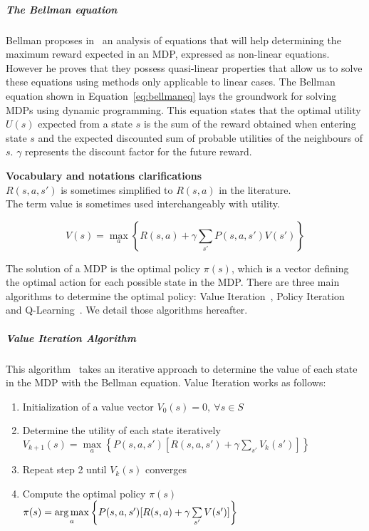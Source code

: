 \subparagraph{The Bellman equation}
Bellman proposes in~\cite{bellman1957} an analysis of equations that will help determining the maximum reward expected in an MDP, expressed as non-linear equations. However he proves that they possess quasi-linear properties that allow us to solve these equations using methods only applicable to linear cases. 
The Bellman equation shown in Equation~\eqref{eq:bellmaneq} lays the groundwork for solving MDPs using dynamic programming.
This equation states that the optimal utility $U(s)$ expected from a state $s$ is the sum of the reward obtained when entering state $s$ and the expected discounted sum of probable utilities of the neighbours of $s$. $\gamma$ represents the discount factor for the future reward.


\textbf{Vocabulary and notations clarifications}\\
$R(s,a,s')$ is sometimes simplified to $R(s,a)$ in the literature.\\
The term value is sometimes used interchangeably with utility.

\begin{equation}
V(s) = \max\limits_a \left \{R(s,a) + \gamma   \sum\limits_{s'} P(s,a,s')V(s') \right \}
\label{eq:bellmaneq}
\end{equation}



The solution of a MDP is the optimal policy $\pi(s)$, which is a vector defining the optimal action for each possible state in the MDP.
There are three main algorithms to determine the optimal policy: Value Iteration~\cite{bellman1957}, Policy Iteration~\cite{policyiteration} and Q-Learning~\cite{qlearning}.
We detail those algorithms hereafter.


\subparagraph{Value Iteration Algorithm}
This algorithm~\cite{bellman1957} takes an iterative approach to determine the value of each state in the MDP with the Bellman equation.
Value Iteration works as follows:
\begin{enumerate}
    \item Initialization of a value vector $V_0(s)=0,~\forall s\in S$
    \item Determine the utility of each state iteratively\\{$V_{k+1}(s) = \max\limits_a \left \{ P(s,a,s')[R(s,a,s') + \gamma \sum\limits_{s'}V_k(s')] \right \}$}
    \item Repeat step 2 until $V_{k}(s)$ converges
    \item Compute the optimal policy $\pi(s)$\\$\pi(s) = \operatorname*{arg\,max}\limits_a \left \{P(s,a,s')[R(s,a) + \gamma \sum\limits_{s'}V(s')] \right \}$
\end{enumerate}

